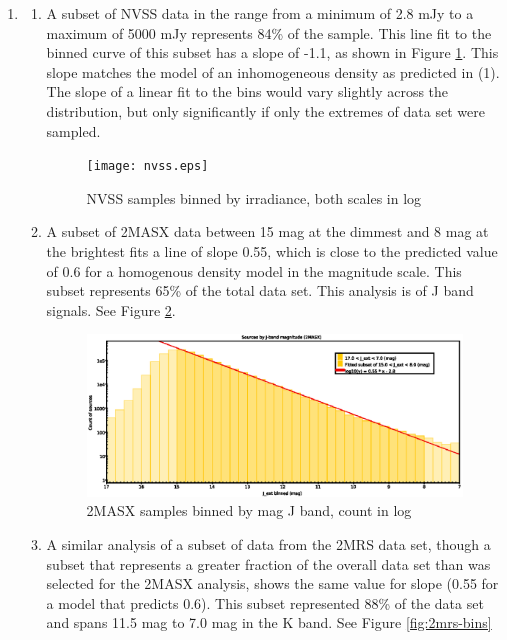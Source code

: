 \documentclass{paper}
\begin{document}
\begin{enumerate}
  \pagebreak \item %
    \begin{enumerate}
      \item
        A subset of NVSS data in the range from a minimum of 2.8 mJy to a
        maximum of 5000 mJy represents 84\% of the sample. This line fit
        to the binned curve of this subset has a slope of -1.1, as shown
        in Figure \ref{fig:nvss-bins}. This slope matches the model of an 
        inhomogeneous density as predicted in (1).  The slope of a linear 
        fit to the bins would vary slightly across the distribution, but only 
        significantly if only the extremes of data set were sampled.

        \begin{figure}[!htb]
          \texttt{[image: nvss.eps]}
          \caption{NVSS samples binned by irradiance, both scales in log}
          \label{fig:nvss-bins}
        \end{figure}

      \item
        A subset of 2MASX data between 15 mag at the dimmest and 8 mag at the
        brightest fits a line of slope 0.55, which is close to the predicted
        value of 0.6 for a homogenous density model in the magnitude scale.
        This subset represents 65\% of the total data set. This analysis
        is of J band signals. See Figure \ref{fig:2masx-bins}.

        \begin{figure}[!htb]
          \includegraphics[width=\linewidth]{2masx.eps}
          \caption{2MASX samples binned by mag J band, count in log}
          \label{fig:2masx-bins}
        \end{figure}

      \item
        A similar analysis of a subset of data from the 2MRS data set, 
        though a subset that represents a greater fraction of the overall 
        data set than was selected for the 2MASX analysis, shows the same
        value for slope (0.55 for a model that predicts 0.6). This subset
        represented 88\% of the data set and spans 11.5 mag to 7.0 mag in the
        K band. See Figure \ref{fig:2mrs-bins}


\end{enumerate}
\end{enumerate}
\end{document}
